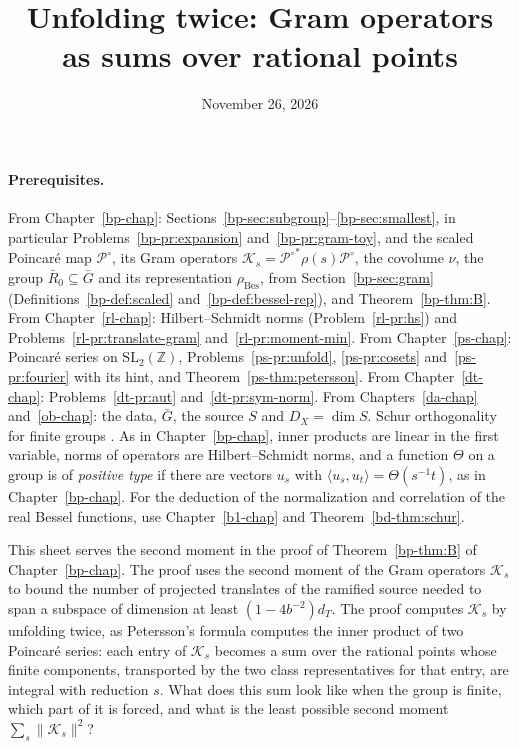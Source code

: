 \documentclass[reqno]{amsart}
\title{Unfolding twice: Gram operators as sums over rational points}
\author{}
\date{November 26, 2026}
\newcounter{chap}
\theoremstyle{definition}
\theoremstyle{plain}
\theoremstyle{remark}
\newcommand{\Z}{\mathbb{Z}}
\newcommand{\Gb}{\bar G}
\newcommand{\Rb}{\bar R_0}
\newcommand{\Kc}{\mathcal K}
\newcommand{\Po}{{\mathcal P^\circ}}
\newcommand{\rB}{\rho_{\mathrm{Bes}}}
\begin{document}
\maketitle
{}\label{chap}

\paragraph{Prerequisites.}
From Chapter~\ref{bp-chap}: Sections~\ref{bp-sec:subgroup}--\ref{bp-sec:smallest}, in particular Problems~\ref{bp-pr:expansion} and~\ref{bp-pr:gram-toy}, and the scaled Poincar\'e map \(\Po\), its Gram operators \(\Kc_s=\Po^*\rho(s)\Po\), the covolume \(\nu\), the group \(\Rb\subseteq\Gb\) and its representation \(\rB\), from Section~\ref{bp-sec:gram} (Definitions~\ref{bp-def:scaled} and~\ref{bp-def:bessel-rep}), and Theorem~\ref{bp-thm:B}.  From Chapter~\ref{rl-chap}: Hilbert--Schmidt norms (Problem~\ref{rl-pr:hs}) and Problems~\ref{rl-pr:translate-gram} and~\ref{rl-pr:moment-min}.  From Chapter~\ref{ps-chap}: Poincar\'e series on \(\mathrm{SL}_2(\Z)\), Problems~\ref{ps-pr:unfold}, \ref{ps-pr:cosets} and~\ref{ps-pr:fourier} with its hint, and Theorem~\ref{ps-thm:petersson}.  From Chapter~\ref{dt-chap}: Problems~\ref{dt-pr:aut} and~\ref{dt-pr:sym-norm}.  From Chapters~\ref{da-chap} and~\ref{ob-chap}: the data, \(\Gb\), the source \(S\) and \(D_X=\dim S\).  Schur orthogonality for finite groups \cite[\S2.2]{Se}.  As in Chapter~\ref{bp-chap}, inner products are linear in the first variable, norms of operators are Hilbert--Schmidt norms, and a function \(\Theta\) on a group is of \emph{positive type} if there are vectors \(u_s\) with \(\langle u_s,u_t\rangle=\Theta(s^{-1}t)\), as in Chapter~\ref{bp-chap}.  For the deduction of the normalization and correlation of the real Bessel functions, use Chapter~\ref{b1-chap} and Theorem~\ref{bd-thm:schur}.

\medskip
This sheet serves the second moment in the proof of Theorem~\ref{bp-thm:B} of Chapter~\ref{bp-chap}.  The proof uses the second moment of the Gram operators \(\Kc_s\) to bound the number of projected translates of the ramified source needed to span a subspace of dimension at least \((1-4b^{-2})d_T\).  The proof computes \(\Kc_s\) by unfolding twice, as Petersson's formula computes the inner product of two Poincar\'e series: each entry of \(\Kc_s\) becomes a sum over the rational points whose finite components, transported by the two class representatives for that entry, are integral with reduction \(s\).  What does this sum look like when the group is finite, which part of it is forced, and what is the least possible second moment \(\sum_s\lVert\Kc_s\rVert^2\)?
\end{document}
